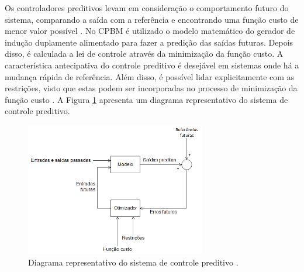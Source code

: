 	Os controladores preditivos levam em consideração o comportamento futuro do sistema, comparando a saída com a referência e encontrando uma função custo de menor valor possível \cite{camachoteoriapreditivomodelo,rositierteoriapreditivomodelo,wangpreditivo}. No CPBM é utilizado o modelo matemático do gerador de indução duplamente alimentado para fazer a predição das saídas futuras. Depois disso, é calculada a lei de controle através da minimização da função custo. A característica antecipativa do controle preditivo é desejável em sistemas onde há a mudança rápida de referência. Além disso, é possível lidar explicitamente com as restrições, visto que estas podem ser incorporadas no processo de minimização da função custo \cite{alfeu}. A Figura \ref{figura:preditivo_esquema} apresenta um diagrama representativo do sistema de controle preditivo.
	\begin{figure}[h]
		\centering
		\includegraphics[width=0.7\textwidth]{Figuras/preditivo_esquematico.png}
		\caption{Diagrama representativo do sistema de controle preditivo \cite{alfeu}.}
		\label{figura:preditivo_esquema}
	\end{figure}

